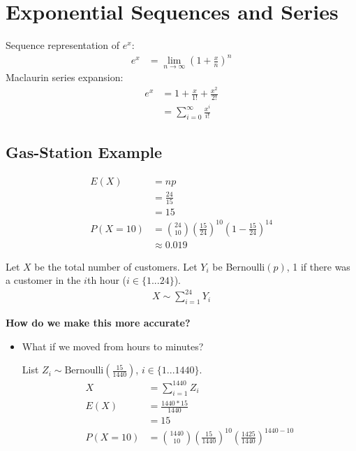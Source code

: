             \section{Exponential Sequences and Series} %
            \label{sec:exponential_sequences_and_series}
                Sequence representation of $e^x$:
                \begin{align*}
                    e^x &= \lim_{n \to \infty} (1 + \frac{x}{n})^n
                \end{align*}
                Maclaurin series expansion:
                \begin{align*}
                    e^x &= 1 + \frac{x}{1!} + \frac{x^2}{2!} \\
                    &= \sum_{i=0}^{\infty} \frac{x^i}{i!}
                \end{align*}

                \subsection{Gas-Station Example} %

                \label{sub:gas_station_example}
                    \begin{align*}
                        E(X) &= np \\
                        &= \frac{24}{15} \\
                        &= 15 \\
                        P(X = 10) &= {24 \choose 10 } (\frac{15}{24})^{10} (1 - \frac{15}{24})^ 14 \\
                        &\approx 0.019
                    \end{align*}

                    Let $X$ be the total number of customers.
                    Let $Y_i$ be Bernoulli$(p)$, 1 if there was a customer in the $i$th hour ($i \in \{1...24\}$).
                    \begin{align*}
                        X \sim \sum_{i=1}^{24} Y_i
                    \end{align*}

                    \textbf{How do we make this more accurate?}

                    \begin{itemize}
                        \item What if we moved from hours to minutes?

                            List $Z_i \sim \text{Bernoulli}(\frac{15}{1440})$, $i \in \{1...1440\}$.
                            \begin{align*}
                                X &= \sum_{i=1}^{1440} Z_i \\
                                E(X) &= \frac{1440 * 15}{1440} \\
                                &= 15 \\
                                P(X = 10) &= {1440 \choose 10} (\frac{15}{1440})^{10} (\frac{1425}{1440})^{1440-10}
                            \end{align*}
                    \end{itemize}

